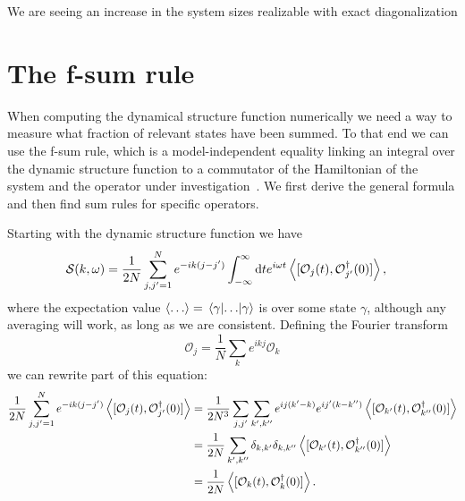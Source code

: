\documentclass[11pt, a4paper]{report} %
\newcommand{\operator}{\mathcal{O}}
\begin{document}
We are seeing an increase in the system sizes realizable with exact diagonalization \cite{wietek18_sublat_codin_algor_distr_memor}

\appendix


\chapter{The f-sum rule}
\label{cha:f-sum-rule}

When computing the dynamical structure function numerically we need a way to measure what fraction of relevant states have been summed.
To that end we can use the f-sum rule, which is a model-independent equality linking an integral over the dynamic structure function to a commutator of the Hamiltonian of the system and the operator under investigation~\cite{pitaevskii}.
We first derive the general formula and then find sum rules for specific operators.

Starting with the dynamic structure function we have
\begin{align}
  	\mathcal{S}(k,\omega) &= \frac{1}{2N} \sum_{j,j'=1}^{N} e^{-ik(j-j')} \int_{-\infty}^{\infty}\dd t e^{i\omega t}\expval{[\operator_j(t),\operator_{j'}^{\dagger}(0)]},
\end{align}
where the expectation value \(\expval{\ldots} = \matrixel{\gamma}{\ldots}{\gamma}\) is over some state \(\gamma\), although any averaging will work, as long as we are consistent.
Defining the Fourier transform
\begin{equation}
  \mathcal{O}_j = \frac{1}{N} \sum_k e^{ikj} \mathcal{O}_k
\end{equation}
we can rewrite part of this equation:
\begin{align}
  \frac{1}{2N} \sum_{j,j'=1}^{N} e^{-ik(j-j')} \expval{[\operator_j(t),\operator_{j'}^{\dagger}(0)]} &= \frac{1}{2N^3} \sum_{j, j'}\sum_{k',k''} e^{ij(k'-k)}e^{ij'(k-k'')}  \expval{[\operator_{k'}(t),\operator_{k''}^{\dagger}(0)]}\\
&= \frac{1}{2N} \sum_{k',k''} \delta_{k,k'}\delta_{k,k''}  \expval{[\operator_{k'}(t),\operator_{k''}^{\dagger}(0)]} \\
&= \frac{1}{2N}  \expval{[\operator_{k}(t),\operator_{k}^{\dagger}(0)]}.
\end{align}
\end{document}
